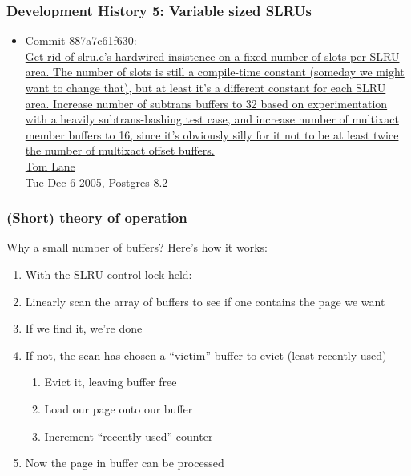 \begin{frame}
  \frametitle{Development History 5: Variable sized SLRUs}
  \begin{itemize}
    \item {\linksize \href{https://git.postgresql.org/cgit/postgresql.git/commit/?id=887a7c61f630}
      {Commit 887a7c61f630: \faExternalLink \\
      Get rid of slru.c's hardwired insistence on a fixed number of slots per
      SLRU area.  \alert<3>{The number of slots is still a compile-time constant (someday
      we might want to change that)}, but at least it's a different constant for
      each SLRU area.  \alert<2>{Increase number of subtrans buffers to 32 based on
      experimentation with a heavily subtrans-bashing test case, and increase
      number of multixact member buffers to 16, since it's obviously silly for
      it not to be at least twice the number of multixact offset buffers.} \\
      Tom Lane \\
      Tue Dec 6 2005, Postgres 8.2}}
  \end{itemize}
\end{frame}

\begin{frame}
  \frametitle{(Short) theory of operation}
  Why a small number of buffers?  Here's how it works:
  \begin{enumerate}
    \item With the SLRU control lock held:
    \item \alert<2>{Linearly scan the array of buffers} to see if one contains the page we want
    \item If we find it, we're done  %
    \item If not, the scan has chosen a ``victim'' buffer to evict (least recently used)
      \begin{enumerate}
	\item Evict it, leaving buffer free
	\item Load our page onto our buffer
	\item Increment ``recently used'' counter
      \end{enumerate}
    \item Now the page in buffer can be processed 
  \end{enumerate}
\end{frame}

